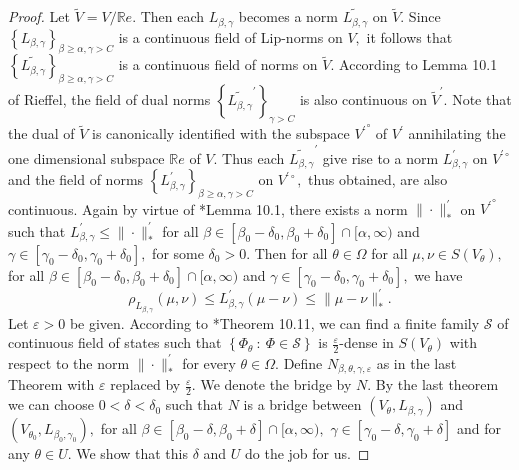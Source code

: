 \documentclass[a4paper,11pt,reqno]{amsart}
\theoremstyle{plain}
\theoremstyle{mainthmstyle}
\theoremstyle{named}
\numberwithin{equation}{section}
\begin{document}
\begin{proof}
Let $\tilde V = V/ \mathbb R e.$ Then each $L_{\beta, \gamma}$ becomes a norm $\widetilde {L_{\beta, \gamma}}$ on $\tilde V.$ Since $\left \{L_{\beta, \gamma} \right \}_{\beta \geq \alpha, \gamma > C}$ is a continuous field of Lip-norms on $V,$ it follows that $\left \{\widetilde {L_{\beta, \gamma}} \right \}_{\beta \geq \alpha, \gamma > C}$ is a continuous field of norms on $\tilde {V}.$ According to Lemma 10.1 of Rieffel, the field of dual norms $\left \{\widetilde {L_{\beta, \gamma}}^{\prime} \right \}_{\gamma > C}$ is also continuous on $\tilde {V}^{\prime}.$ Note that the dual of $\tilde {V}$ is canonically identified with the subspace ${V^{\prime}}^{\circ}$ of $V^{\prime}$ annihilating the one dimensional subspace $\mathbb R e$ of $V.$ Thus each $\widetilde {L_{\beta, \gamma}}^{\prime}$ give rise to a norm $L_{\beta, \gamma}^\prime$ on $V^{\prime \circ}$ and the field of norms $\left \{L_{\beta, \gamma}^{\prime} \right \}_{\beta \geq \alpha, \gamma > C}$ on $V^{\prime \circ},$ thus obtained, are also continuous. Again by virtue of \cite{Rieffel-Gromov}*{Lemma 10.1}, there exists a norm $\|\cdot\|_{\ast}^{\prime}$ on ${V^{\prime}}^{\circ}$ such that $L_{\beta, \gamma}^{\prime} \leq \|\cdot\|_{\ast}^{\prime}$ for all $\beta \in \left [\beta_0 - \delta_0, \beta_0 + \delta_0 \right ] \cap [\alpha, \infty)$ and $\gamma \in \left [\gamma_0 - \delta_0, \gamma_0 + \delta_0 \right ],$ for some $\delta_0>0$. Then for all $\theta \in \Omega$ for all $\mu, \nu \in S \left (V_{\theta} \right ),$ for all $\beta \in \left [\beta_0 - \delta_0, \beta_0 + \delta_0 \right ] \cap [\alpha, \infty)$ and $\gamma \in \left [\gamma_0 - \delta_0, \gamma_0 + \delta_0 \right ],$ we have 
$$\rho_{L_{\beta, \gamma}} (\mu, \nu) \leq L_{\beta, \gamma}^{\prime} (\mu - \nu) \leq \|\mu - \nu \|_{\ast}^{\prime}.$$
Let $\varepsilon > 0$ be given. According to \cite{Rieffel-Gromov}*{Theorem 10.11}, we can find a finite family $\mathcal S$ of continuous field of states such that $\left \{\Phi_{\theta}\ :\ \Phi \in \mathcal S \right \}$ is $\frac {\varepsilon} {2}$-dense in $S \left (V_{\theta} \right )$ with respect to the norm $\|\cdot\|_{\ast}^{\prime}$ for every $\theta \in \Omega.$ Define $N_{\beta, \theta, \gamma, \varepsilon}$ as in the last Theorem with $\varepsilon$ replaced by $\frac {\varepsilon} {2}.$ We denote the bridge by $N$. By the last theorem we can choose $0 < \delta < \delta_0$ such that $N$ is a bridge between $\left (V_{\theta}, L_{\beta, \gamma} \right )$ and $\left (V_{\theta_0}, L_{\beta_0, \gamma_0} \right ),$ for all $\beta \in \left [\beta_0 - \delta, \beta_0 + \delta \right ] \cap [\alpha, \infty),$ $\gamma \in \left [\gamma_0 - \delta, \gamma_0 + \delta \right ]$ and for any $\theta\in U$. We show that this $\delta$ and $U$ do the job for us.


\end{proof}
\end{document}
